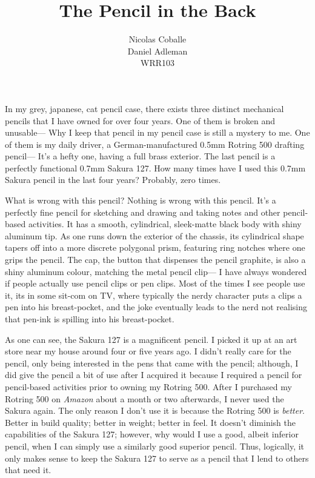 \documentclass[12pt]{article}
\title{The Pencil in the Back}
\author{Nicolas Coballe \\ Daniel Adleman \\ WRR103}
\begin{document}
\maketitle


\doublespacing

In my grey, japanese, cat pencil case, there exists three distinct mechanical pencils that I have owned for over four years. One of them is broken and unusable--- Why I keep that pencil in my pencil case is still a mystery to me. One of them is my daily driver, a German-manufactured 0.5mm Rotring 500 drafting pencil--- It's a hefty one, having a full brass exterior. The last pencil is a perfectly functional 0.7mm Sakura 127. How many times have I used this 0.7mm Sakura pencil in the last four years? Probably, zero times.

What is wrong with this pencil? Nothing is wrong with this pencil. It's a perfectly fine pencil for sketching and drawing and taking notes and other pencil-based activities. It has a smooth, cylindrical, sleek-matte black body with shiny aluminum tip. As one runs down the exterior of the chassis, its cylindrical shape tapers off into a more discrete polygonal prism, featuring ring notches where one grips the pencil. The cap, the button that dispenses the pencil graphite, is also a shiny aluminum colour, matching the metal pencil clip--- I have always wondered if people actually use pencil clips or pen clips. Most of the times I see people use it, its in some sit-com on TV, where typically the nerdy character puts a clips a pen into his breast-pocket, and the joke eventually leads to the nerd not realising that pen-ink is spilling into his breast-pocket.

As one can see, the Sakura 127 is a magnificent pencil. I picked it up at an art store near my house around four or five years ago. I didn't really care for the pencil, only being interested in the pens that came with the pencil; although, I did give the pencil a bit of use after I acquired it because I required a pencil for pencil-based activities prior to owning my Rotring 500. After I purchased my Rotring 500 on \textit{Amazon} about a month or two afterwards, I never used the Sakura again. The only reason I don't use it is because the Rotring 500 is \textit{better}. Better in build quality; better in weight; better in feel. It doesn't diminish the capabilities of the Sakura 127; however, why would I use a good, albeit inferior pencil, when I can simply use a similarly good superior pencil. Thus, logically, it only makes sense to keep the Sakura 127 to serve as a pencil that I lend to others that need it.
\end{document}
